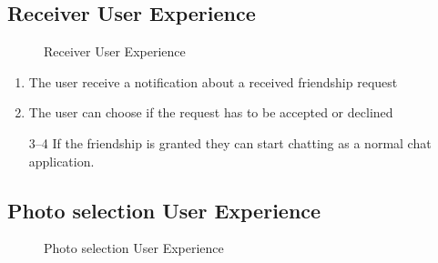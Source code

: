 \subsection{Receiver User Experience}

\begin{figure}[H]
\caption{Receiver User Experience}
\end{figure}

\begin{enumerate}
\item The user receive a notification about a received friendship request 

\item The user can choose if the request has to be accepted or declined


\item[3--4] If the friendship is granted they can start chatting as a normal chat application.
\end{enumerate}

\newpage

\subsection{Photo selection User Experience}

\begin{figure}[H]
\caption{Photo selection User Experience}
\end{figure}

